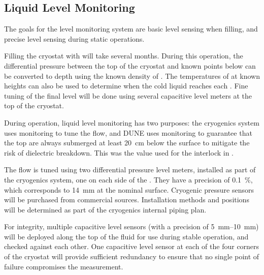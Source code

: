 \subsection{Liquid Level Monitoring}

The goals for the \lar level monitoring system are basic level sensing when filling, and precise level sensing during static operations. 

Filling the cryostat with \lar will take several months. During this operation, 
the differential pressure between the top of
the cryostat and known points below can be converted to depth using
the known density of \lar.  The temperatures of  at known
heights can also be used to determine when the cold liquid reaches 
each . Fine tuning of the final \lar level will be done using 
several capacitive level meters at the top of the cryostat. 

During operation, liquid level monitoring has two purposes:
the  cryogenics system uses monitoring to tune the \lar flow, and 
DUNE uses monitoring to guarantee that the top  are always
submerged %
at least \SI{20}{cm} below the \lar surface to mitigate the risk of dielectric breakdown. This was the value used for the  interlock in . 

The \lar flow 
is tuned using two differential pressure level meters, installed as part of the cryogenics system, one on each side of the .  They 
have a precision of \SI{0.1}{\%}, which corresponds to \SI{14}{mm} at the
nominal \lar surface. Cryogenic pressure sensors will be purchased from commercial sources. Installation methods and positions will be determined as part of the
cryogenics internal piping plan.  


For  integrity, multiple capacitive level sensors (with a precision of \SIrange{5}{10}{mm}) will be deployed along the top of the fluid %
for use during stable operation, and checked against each other.
One capacitive level sensor at each of the four corners of the cryostat will provide sufficient redundancy to ensure that no single point of failure compromises the %
measurement.


